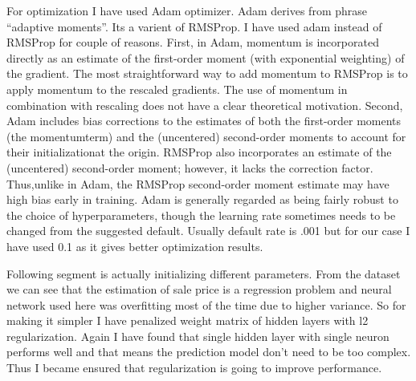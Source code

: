 \documentclass[11pt, a4paper , landscape]{article}
\begin{document}
    For optimization I have used Adam optimizer. Adam derives from phrase
``adaptive moments''. Its a varient of RMSProp. I have used adam instead
of RMSProp for couple of reasons. First, in Adam, momentum is
incorporated directly as an estimate of the ﬁrst-order moment (with
exponential weighting) of the gradient. The most straightforward way to
add momentum to RMSProp is to apply momentum to the rescaled gradients.
The use of momentum in combination with rescaling does not have a clear
theoretical motivation. Second, Adam includes bias corrections to the
estimates of both the ﬁrst-order moments (the momentumterm) and the
(uncentered) second-order moments to account for their initializationat
the origin. RMSProp also incorporates an estimate of the (uncentered)
second-order moment; however, it lacks the correction factor.
Thus,unlike in Adam, the RMSProp second-order moment estimate may have
high bias early in training. Adam is generally regarded as being fairly
robust to the choice of hyperparameters, though the learning rate
sometimes needs to be changed from the suggested default. Usually
default rate is .001 but for our case I have used 0.1 as it gives better
optimization results.

    Following segment is actually initializing different parameters. From
the dataset we can see that the estimation of sale price is a regression
problem and neural network used here was overfitting most of the time
due to higher variance. So for making it simpler I have penalized weight
matrix of hidden layers with l2 regularization. Again I have found that
single hidden layer with single neuron performs well and that means the
prediction model don't need to be too complex. Thus I became ensured
that regularization is going to improve performance.
\end{document}
